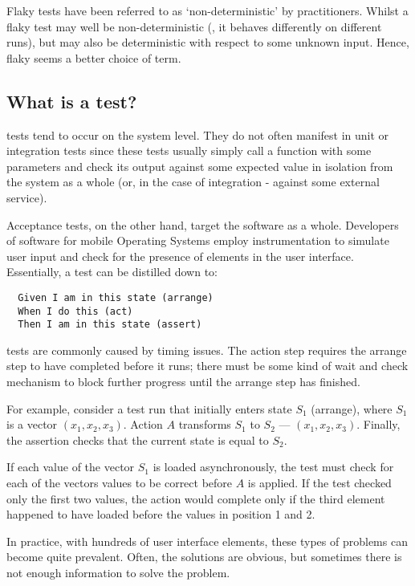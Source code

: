 Flaky tests have been referred to as {\lq}non-deterministic{\rq} by practitioners. Whilst a flaky test may well be non-deterministic (\ie, it behaves differently on different runs), but may also be deterministic with respect to some unknown input. Hence, flaky seems a better choice of term.


\subsection{What is a \flaky{} test?}

\flaky{} tests tend to occur on the system level. They do not often manifest in unit or integration tests since these tests usually simply call a function with some parameters and check its output against some expected value in isolation from the system as a whole (or, in the case of integration - against some external service).

Acceptance tests, on the other hand, target the software as a whole. Developers of software for mobile Operating Systems employ instrumentation to simulate user input and check for the presence of elements in the user interface. Essentially, a test can be distilled down to:
\begin{verbatim}
  Given I am in this state (arrange)
  When I do this (act)
  Then I am in this state (assert)
\end{verbatim}

\flaky{} tests are commonly caused by timing issues. The action step requires the arrange step to have completed before it runs; there must be some kind of wait and check mechanism to block further progress until the arrange step has finished.

For example, consider a test run that initially enters state $S_{1}$ (arrange), where $S_{1}$ is a vector $(x_{1},x_{2},x_{3})$. Action $A$ transforms $S_1$ to $S_2$ --- $(x_{1},x_{2},x_{3})$. Finally, the assertion checks that the current state is equal to $S_2$.

If each value of the vector $S_{1}$ is loaded asynchronously, the test must check for each of the vectors values to be correct before $A$ is applied. If the test checked only the first two values, the action would complete only if the third element happened to have loaded before the values in position 1 and 2.

In practice, with hundreds of user interface elements, these types of problems can become quite prevalent. Often, the solutions are obvious, but sometimes there is not enough information to solve the problem.


